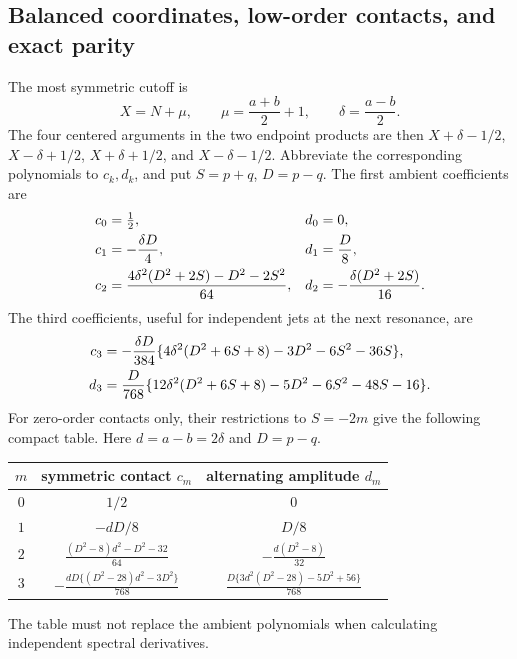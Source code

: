 \subsection{Balanced coordinates, low-order contacts, and exact parity}

The most symmetric cutoff is
\begin{equation}\label{ct:balanced}
 X=N+\mu,\qquad \mu=\frac{a+b}{2}+1,\qquad
 \delta=\frac{a-b}{2}.
\end{equation}
The four centered arguments in the two endpoint products are then
$X+\delta-1/2$, $X-\delta+1/2$, $X+\delta+1/2$, and
$X-\delta-1/2$. Abbreviate the corresponding polynomials to $c_k,d_k$,
and put $S=p+q$, $D=p-q$. The first ambient coefficients are
\begin{align}
 c_0&=\tfrac12,&d_0&=0,\notag\\
 c_1&=-\frac{\delta D}{4},&d_1&=\frac D8,\label{ct:lowambient}\\
 c_2&=\frac{4\delta^2(D^2+2S)-D^2-2S^2}{64},&
 d_2&=-\frac{\delta(D^2+2S)}{16}.\notag
\end{align}
The third coefficients, useful for independent jets at the next resonance,
are
\begin{align}
 c_3&=-\frac{\delta D}{384}
 \{4\delta^2(D^2+6S+8)-3D^2-6S^2-36S\},\label{ct:thirdambient}\\
 d_3&=\frac D{768}
 \{12\delta^2(D^2+6S+8)-5D^2-6S^2-48S-16\}.\notag
\end{align}
For zero-order contacts only, their restrictions to $S=-2m$ give the
following compact table. Here $d=a-b=2\delta$ and $D=p-q$.
\begin{center}
\renewcommand{\arraystretch}{1.6}
\begin{tabular}{c|c|c}
$m$&symmetric contact $c_m$&alternating amplitude $d_m$\\\hline
$0$&$1/2$&$0$\\
$1$&$-dD/8$&$D/8$\\
$2$&$\displaystyle\frac{(D^2-8)d^2-D^2-32}{64}$
   &$\displaystyle-\frac{d(D^2-8)}{32}$\\
$3$&$\displaystyle-\frac{dD\{(D^2-28)d^2-3D^2\}}{768}$
   &$\displaystyle\frac{D\{3d^2(D^2-28)-5D^2+56\}}{768}$
\end{tabular}
\end{center}
The table must not replace the ambient polynomials when calculating
independent spectral derivatives.

